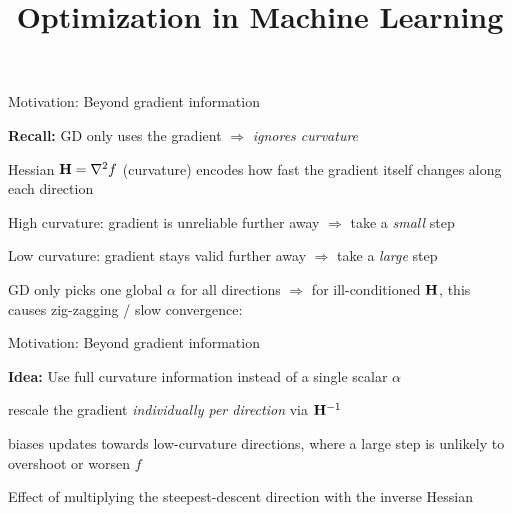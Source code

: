 \documentclass[11pt,compress,t,notes=noshow, xcolor=table]{beamer}
\title{Optimization in Machine Learning}
\begin{document}

\begin{framei}{Motivation: Beyond gradient information}
\item \textbf{Recall:} GD only uses the gradient $\Rightarrow$ \textit{ignores curvature}
\item Hessian $\mathbf{H} = \nabla^2 f$ (curvature) encodes how fast the gradient itself changes along each direction
\begin{itemizeM}
\item High curvature: gradient is unreliable further away $\Rightarrow$ take a \textit{small} step
\item Low curvature: gradient stays valid further away $\Rightarrow$ take a \textit{large} step
\end{itemizeM}
\item GD only picks one global $\alpha$ for all directions $\Rightarrow$ for ill-conditioned $\mathbf{H}$, this causes zig-zagging / slow convergence:
\end{framei}


\begin{framei}[sep=L]{Motivation: Beyond gradient information}
\item \textbf{Idea:} Use full curvature information instead of a single scalar $\alpha$
\begin{itemizeM}
\item rescale the gradient \textit{individually per direction} via $\mathbf{H}^{-1}$
\item biases updates towards low-curvature directions, where a large step is unlikely to overshoot or worsen $f$
\end{itemizeM}
\begin{center}{\footnotesize Effect of multiplying the steepest-descent direction with the inverse
Hessian}\end{center}
\end{framei}
\end{document}
